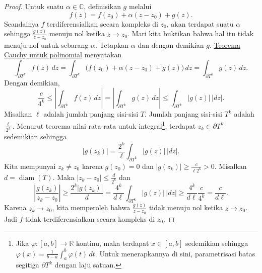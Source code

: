 \documentclass[12pt,openany]{book}
\newcommand{\sabs}[1]{\lvert {#1} \rvert}
\newcommand{\abs}[1]{\left\lvert {#1} \right\rvert}
\newcommand{\C}{{\mathbb{C}}}
\newcommand{\R}{{\mathbb{R}}}
\theoremstyle{plain}
\theoremstyle{remark}
\theoremstyle{definition}
\theoremstyle{exercise}
\theoremstyle{example}
\begin{document}
\begin{proof}
Untuk suatu $\alpha \in \C$, definisikan $g$ melalui
\begin{equation*}
f(z) = f(z_0) + \alpha (z-z_0) + g(z) .
\end{equation*}
Seandainya $f$ terdiferensialkan secara kompleks di $z_0$, akan terdapat suatu $\alpha$ sehingga
$\frac{g(z)}{z-z_0}$ menuju nol ketika $z \to z_0$.
Mari kita buktikan bahwa hal itu tidak menuju nol untuk sebarang $\alpha$.  Tetapkan $\alpha$
dan dengan demikian $g$.
\hyperref[cor:cauchyforpoly]{Teorema Cauchy untuk polinomial} menyatakan
\begin{equation*}
\int_{\partial T^k} f(z) \, dz =
\int_{\partial T^k} \bigl( f(z_0) + \alpha (z-z_0) + g(z) \bigr) \, dz =
\int_{\partial T^k} g(z) \, dz .
\end{equation*}
Dengan demikian,
\begin{equation*}
\frac{c}{4^k} \leq
\abs{
\int_{\partial T^k} f(z) \, dz
} =
\abs{
\int_{\partial T^k} g(z) \, dz 
}
\leq
\int_{\partial T^k} \sabs{g(z)} \, \sabs{dz} .
\end{equation*}
Misalkan $\ell$ adalah jumlah panjang sisi-sisi $T$.
Jumlah panjang sisi-sisi $T^k$ adalah
$\frac{\ell}{2^k}$.
Menurut teorema nilai rata-rata untuk integral\footnote{%
Jika $\varphi \colon [a,b] \to \R$ kontinu, maka terdapat $x \in [a,b]$
sedemikian sehingga $\varphi(x) = \frac{1}{b-a} \int_a^b \varphi(t) \, dt$.
Untuk menerapkannya di sini, parametrisasi batas segitiga $\partial T^k$ dengan laju satuan.},
terdapat $z_k \in \partial T^k$ sedemikian sehingga
\begin{equation*}
\sabs{g(z_k)} = 
\frac{2^k}{\ell}
\int_{\partial T^k} \sabs{g(z)} \, \sabs{dz} .
\end{equation*}
Kita mempunyai $z_k \neq z_0$ karena $g(z_0)=0$
dan $\sabs{g(z_k)} \geq \frac{c}{\ell 2^k} > 0$.
Misalkan $d = \operatorname{diam}(T)$.  Maka
$\sabs{z_k-z_0} \leq \frac{d}{2^k}$ dan
\begin{equation*}
\abs{\frac{g(z_k)}{z_k-z_0}}
\geq
\frac{2^k\sabs{g(z_k)}}{d}
=
\frac{4^k}{d \ell}
\int_{\partial T^k} \sabs{g(z)} \, \sabs{dz}
\geq
\frac{4^k}{d \ell}
\frac{c}{4^k} = \frac{c}{d \ell} .
\end{equation*}
Karena $z_k \to z_0$, kita memperoleh bahwa $\frac{g(z)}{z-z_0}$ tidak 
menuju nol ketika $z \to z_0$.  Jadi $f$ tidak terdiferensialkan secara kompleks di $z_0$.
\end{proof}
\end{document}
